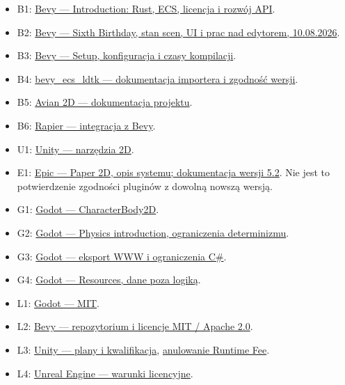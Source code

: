 \documentclass[10pt,a4paper]{article}
\begin{document}
\begin{itemize}
\item B1: \href{https://bevy.org/learn/quick-start/introduction/}{Bevy — Introduction: Rust, ECS, licencja i rozwój API}.
\item B2: \href{https://bevy.org/news/bevys-sixth-birthday/}{Bevy — Sixth Birthday, stan scen, UI i prac nad edytorem, 10.08.2026}.
\item B3: \href{https://bevy.org/learn/quick-start/getting-started/setup/}{Bevy — Setup, konfiguracja i czasy kompilacji}.
\item B4: \href{https://github.com/Trouv/bevy_ecs_ldtk}{bevy\_ecs\_ldtk — dokumentacja importera i zgodność wersji}.
\item B5: \href{https://docs.rs/avian2d/latest/avian2d/}{Avian 2D — dokumentacja projektu}.
\item B6: \href{https://rapier.rs/docs/user_guides/bevy_plugin/getting_started_bevy/}{Rapier — integracja z Bevy}.
\item U1: \href{https://docs.unity3d.com/Manual/Unity2D.html}{Unity — narzędzia 2D}.
\item E1: \href{https://dev.epicgames.com/documentation/unreal-engine/paper-2d-in-unreal-engine?application_version=5.2}{Epic — Paper 2D, opis systemu; dokumentacja wersji 5.2}. Nie jest to potwierdzenie zgodności pluginów z dowolną nowszą wersją.
\item G1: \href{https://docs.godotengine.org/en/stable/classes/class_characterbody2d.html}{Godot — CharacterBody2D}.
\item G2: \href{https://docs.godotengine.org/en/stable/tutorials/physics/physics_introduction.html}{Godot — Physics introduction, ograniczenia determinizmu}.
\item G3: \href{https://docs.godotengine.org/en/stable/tutorials/export/exporting_for_web.html}{Godot — eksport WWW i ograniczenia C\#}.
\item G4: \href{https://docs.godotengine.org/en/stable/tutorials/scripting/resources.html}{Godot — Resources, dane poza logiką}.
\item L1: \href{https://godotengine.org/license/}{Godot — MIT}.
\item L2: \href{https://github.com/bevyengine/bevy}{Bevy — repozytorium i licencje MIT / Apache 2.0}.
\item L3: \href{https://unity.com/products}{Unity — plany i kwalifikacja}, \href{https://unity.com/products/pricing-updates}{anulowanie Runtime Fee}.
\item L4: \href{https://www.unrealengine.com/license}{Unreal Engine — warunki licencyjne}.
\end{itemize}
\end{document}
